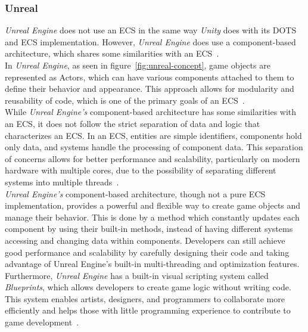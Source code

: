 \subsubsection{Unreal}\label{subsubsec:unreal:-component-based-architecture}
\textit{Unreal Engine} does not use an \gls{ECS} in the same way \textit{Unity} does with its \gls{DOTS} and \gls{ECS} implementation.
However, \textit{Unreal Engine} does use a component-based architecture, which shares some similarities with an \gls{ECS}~\cite{UNREAL:Framework}.
\\
In \textit{Unreal Engine}, as seen in figure~\ref{fig:unreal-concept}, game objects are represented as Actors, which can have
various components attached to them to define their behavior and appearance.
This approach allows for modularity and reusability of code, which is one of the primary goals of an \gls{ECS}~\cite{UNREAL:Framework}.
\\
While \textit{Unreal Engine's} component-based architecture has some similarities with an \gls{ECS}, it does not follow the strict separation of
data and logic that characterizes an \gls{ECS}. In an \gls{ECS}, entities are simple identifiers, components hold only data, and systems
handle the processing of component data.
This separation of concerns allows for better performance and scalability, particularly on modern hardware with multiple cores, due to the possibility
of separating different systems into multiple threads~\cite{UNREAL:Framework}.
\\
\textit{Unreal Engine's} component-based architecture, though not a pure \gls{ECS} implementation, provides a powerful
and flexible way to create game objects and manage their behavior.
This is done by a method which constantly updates each component by using their built-in methods, instead of having different systems accessing and changing data within components.
Developers can still achieve good performance and scalability by carefully designing their code and taking
advantage of Unreal Engine's built-in multi-threading and optimization features.
\\
Furthermore, \textit{Unreal Engine} has a built-in visual scripting system called \textit{Blueprints}, which allows developers to create game logic without writing code.
This system enables artists, designers, and programmers to collaborate more efficiently and helps those with little programming experience to contribute
to game development~\cite{UNREAL:Framework}.
